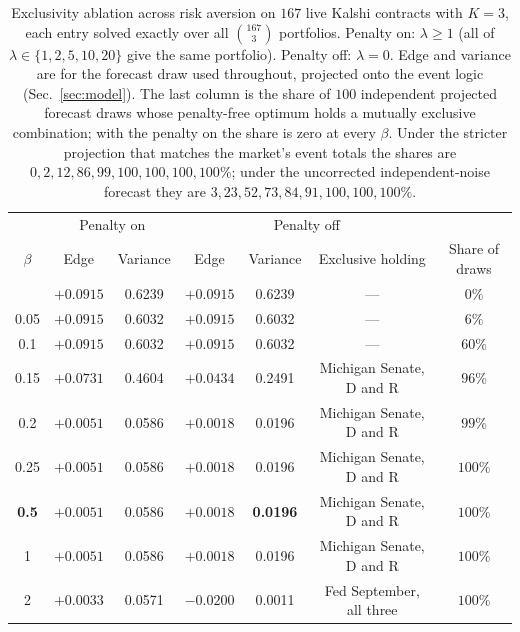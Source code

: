 \documentclass[aps, reprint, prl, twocolumn, superscriptaddress,amsmath,amssymb,noeprint]{revtex4-2}
\begin{document}
\begin{table}[t]
\caption{\label{tab:ablation}Exclusivity ablation across risk aversion on
$167$ live Kalshi contracts with $K = 3$, each entry solved exactly over all
$\binom{167}{3}$ portfolios.  Penalty on: $\lambda \ge 1$ (all of
$\lambda \in \{1,2,5,10,20\}$ give the same portfolio).  Penalty off:
$\lambda = 0$.  Edge and variance are for the forecast draw used throughout,
projected onto the event logic (Sec.~\ref{sec:model}).  The last column is the
share of $100$ independent projected forecast draws whose penalty-free optimum
holds a mutually exclusive combination; with the penalty on the share is zero
at every $\beta$.  Under the stricter projection that matches the market's
event totals the shares are $0, 2, 12, 86, 99, 100, 100, 100, 100\%$; under the
uncorrected independent-noise forecast they are
$3, 23, 52, 73, 84, 91, 100, 100, 100\%$.}
\begin{ruledtabular}
\begin{tabular}{ccccccc}
 & \multicolumn{2}{c}{Penalty on} & \multicolumn{3}{c}{Penalty off} & \\
$\beta$ & Edge & Variance & Edge & Variance & Exclusive holding & Share of draws \\
\colrule
0    & $+0.0915$ & 0.6239 & $+0.0915$ & 0.6239 & ---                       & $0\%$ \\
0.05 & $+0.0915$ & 0.6032 & $+0.0915$ & 0.6032 & ---                       & $6\%$ \\
0.1  & $+0.0915$ & 0.6032 & $+0.0915$ & 0.6032 & ---                       & $60\%$ \\
0.15 & $+0.0731$ & 0.4604 & $+0.0434$ & 0.2491 & Michigan Senate, D and R  & $96\%$ \\
0.2  & $+0.0051$ & 0.0586 & $+0.0018$ & 0.0196 & Michigan Senate, D and R  & $99\%$ \\
0.25 & $+0.0051$ & 0.0586 & $+0.0018$ & 0.0196 & Michigan Senate, D and R  & $100\%$ \\
\textbf{0.5} & $+0.0051$ & 0.0586 & $+0.0018$ & \textbf{0.0196} & Michigan Senate, D and R & $100\%$ \\
1    & $+0.0051$ & 0.0586 & $+0.0018$ & 0.0196 & Michigan Senate, D and R  & $100\%$ \\
2    & $+0.0033$ & 0.0571 & $-0.0200$ & 0.0011 & Fed September, all three  & $100\%$ \\
\end{tabular}
\end{ruledtabular}
\end{table}
\end{document}
